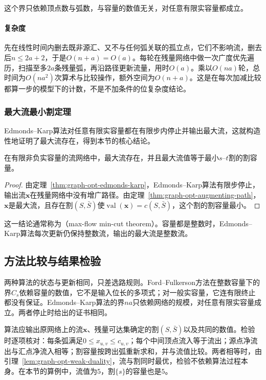 这个界只依赖顶点数与弧数，与容量的数值无关，对任意有限实容量都成立。

\paragraph{复杂度}
先在线性时间内删去既非源汇、又不与任何弧关联的孤立点，它们不影响流，删去后$n\leq2a+2$，于是$O(n+a)=O(a)$。每轮在残量网络中做一次广度优先遍历，扫描至多$2a$条残量弧，再沿路径更新流量，用时$O(a)$。乘以$O(na)$轮，总时间为$O(na^2)$次算术与比较操作，额外空间为$O(n+a)$。这是在每次加减比较都算一步的模型下的计数，不是不加条件的位复杂度结论。

\subsubsection{最大流最小割定理}

Edmonds--Karp算法对任意有限实容量都在有限步内停止并输出最大流，这就构造性地证明了最大流存在，得到本节的核心结论。

\begin{theorem}[最大流最小割定理]
\label{thm:graph-opt-max-flow-min-cut}
在有限非负实容量的流网络中，最大流存在，并且最大流值等于最小$s$--$t$割的割容量。
\end{theorem}

\begin{proof}
由定理~\ref{thm:graph-opt-edmonds-karp}，Edmonds--Karp算法有限步停止，输出流$\bm x$在残量网络中没有增广路径。由定理~\ref{thm:graph-opt-augmenting-path}，$\bm x$是最大流，且存在割$(S,\bar S)$使$\operatorname{val}(\bm x)=c(S,\bar S)$，这个割的割容量最小。
\end{proof}

这一结论通常称为（max-flow min-cut theorem）。容量都是整数时，Edmonds--Karp算法每次更新仍保持整数流，输出的最大流是整数流。

\subsection{方法比较与结果检验}
\label{sec:graph-opt-max-flow-analysis}

两种算法的状态与更新相同，只差选路规则。Ford--Fulkerson方法在整数容量下的界$C_s$依赖容量的数值，它不是输入位长的多项式；对一般实容量，它连有限终止都没有保证。Edmonds--Karp算法的界$na$只依赖网络的规模，对任意有限实容量成立。两者停止时给出的证书相同。

算法应输出原网络上的流$\bm x$、残量可达集确定的割$(S,\bar S)$以及共同的数值。检验时逐项核对：每条弧满足$0\leq x_{u,v}\leq c_{u,v}$；每个中间顶点流入等于流出；源点净流出与汇点净流入相等；割容量按跨出弧重新求和，并与流值比较。两者相等时，由引理~\ref{lem:graph-opt-weak-duality}，流与割同时最优，检验不依赖算法过程本身。在本节的算例中，流值为$5$，割$\{s\}$的容量也是$5$。

